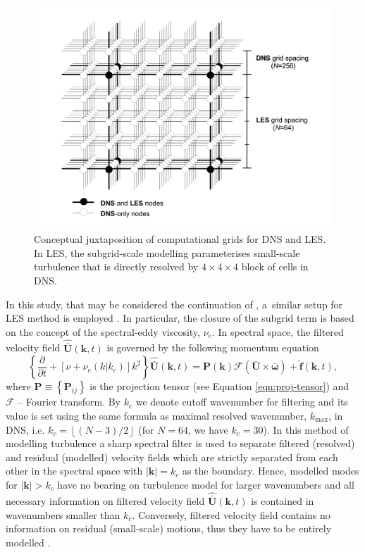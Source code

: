 \documentclass{pracamgren}
\begin{document}
\begin{figure}[ht]
\centering
\includegraphics[width=17cm]{figures/1-02_dns-les-grids.pdf}
\caption{
Conceptual juxtaposition of computational grids for DNS and LES.
In LES, the subgrid-scale modelling parameterises small-scale turbulence that is directly resolved by $4 \times 4 \times 4$ block of cells in DNS.
}
\label{fig:dns-les-grids}
\end{figure}

In this study, that may be considered the continuation of \textcite{Rosa2017}, a~similar setup for LES method is employed \parencite[based on earlier work by][]{Jin2010}.
In particular, the closure of the subgrid term is based on the concept of the spectral-eddy viscosity, $\nu_{e}$.
In spectral space, the filtered velocity field $\mathbf{\hat{\bar{U}}}(\mathbf{k}, t)$ is governed by the following momentum equation \parencite{Pope2000}
\begin{equation}
\left\lbrace \frac{\partial}{\partial t} + [\nu + \nu_{e}(k|k_{c})]k^{2} \right\rbrace \mathbf{\hat{\bar{U}}}(\mathbf{k}, t) = \mathbf{P}(\mathbf{k}) \mathcal{F}(\mathbf{\bar{U}} \times \boldsymbol{\bar{\omega}}) + \hat{\mathbf{f}}(\mathbf{k}, t) ,
\label{eqn:les}
\end{equation}
where $\mathbf{P} \equiv \left\{ \mathbf{P}_{ij} \right\}$ is the projection tensor (see Equation \ref{eqn:proj-tensor}) and $\mathcal{F}$ -- Fourier transform.
By $k_{c}$ we denote cutoff wavenumber for filtering and its value is set using the same formula as maximal resolved wavenumber, $k_{\max}$, in DNS, i.e. $k_c = \left\lfloor (N - 3) / 2 \right\rfloor$ (for $N=64$, we have $k_c = 30$).
In this method of modelling turbulence a sharp spectral filter is used to separate filtered (resolved) and residual (modelled) velocity fields which are strictly separated from each other in the spectral space with $| \mathbf{k} | = k_c$ as the boundary.
Hence, modelled modes for $| \mathbf{k} | > k_c$ have no bearing on turbulence model for larger wavenumbers and all necessary information on filtered velocity field $\mathbf{\hat{\bar{U}}}(\mathbf{k}, t)$ is contained in wavenumbers smaller than $k_c$.
Conversely, filtered velocity field contains no information on residual (small-scale) motions, thus they have to be entirely modelled \parencite[p. 615]{Pope2000}.
\end{document}
